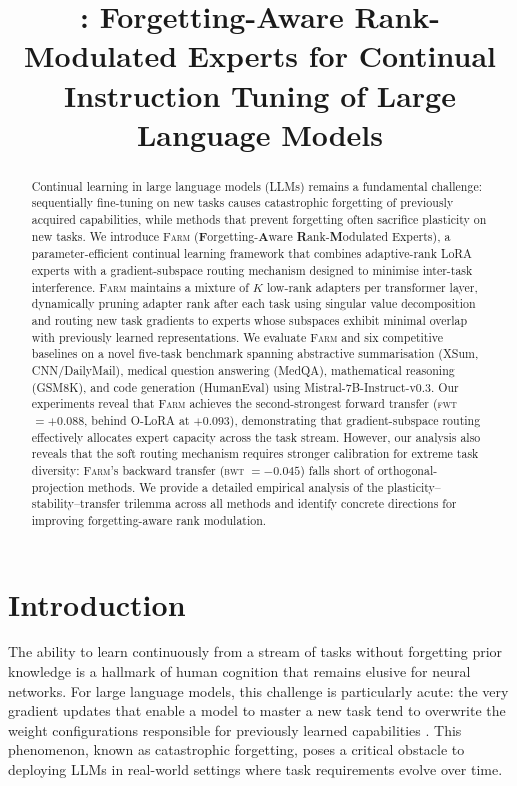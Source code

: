 \documentclass{article}
\title{\FARM\@: Forgetting-Aware Rank-Modulated Experts for Continual Instruction Tuning of Large Language Models}
\newcommand{\FARM}{\textsc{Farm}}
\newcommand{\BWT}{\textsc{bwt}}
\newcommand{\FWT}{\textsc{fwt}}
\begin{document}
\maketitle

\begin{abstract}
Continual learning in large language models (LLMs) remains a fundamental challenge: sequentially fine-tuning on new tasks causes catastrophic forgetting of previously acquired capabilities, while methods that prevent forgetting often sacrifice plasticity on new tasks. We introduce \FARM{} (\textbf{F}orgetting-\textbf{A}ware \textbf{R}ank-\textbf{M}odulated Experts), a parameter-efficient continual learning framework that combines adaptive-rank LoRA experts with a gradient-subspace routing mechanism designed to minimise inter-task interference. \FARM{} maintains a mixture of $K$ low-rank adapters per transformer layer, dynamically pruning adapter rank after each task using singular value decomposition and routing new task gradients to experts whose subspaces exhibit minimal overlap with previously learned representations. We evaluate \FARM{} and six competitive baselines on a novel five-task benchmark spanning abstractive summarisation (XSum, CNN/DailyMail), medical question answering (MedQA), mathematical reasoning (GSM8K), and code generation (HumanEval) using Mistral-7B-Instruct-v0.3. Our experiments reveal that \FARM{} achieves the second-strongest forward transfer (\FWT{} $= +0.088$, behind O-LoRA at $+0.093$), demonstrating that gradient-subspace routing effectively allocates expert capacity across the task stream. However, our analysis also reveals that the soft routing mechanism requires stronger calibration for extreme task diversity: \FARM{}'s backward transfer (\BWT{} $= -0.045$) falls short of orthogonal-projection methods. We provide a detailed empirical analysis of the plasticity–stability–transfer trilemma across all methods and identify concrete directions for improving forgetting-aware rank modulation.
\end{abstract}

\section{Introduction}
\label{sec:intro}

The ability to learn continuously from a stream of tasks without forgetting prior knowledge is a hallmark of human cognition that remains elusive for neural networks. For large language models, this challenge is particularly acute: the very gradient updates that enable a model to master a new task tend to overwrite the weight configurations responsible for previously learned capabilities \citep{mccloskey1989catastrophic, kirkpatrick2017overcoming}. This phenomenon, known as catastrophic forgetting, poses a critical obstacle to deploying LLMs in real-world settings where task requirements evolve over time.
\end{document}

